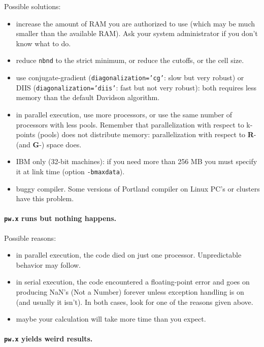 \documentclass[12pt,a4paper]{article}
\begin{document}
Possible solutions:
\begin{itemize}
  \item
    increase the amount of RAM you are authorized to use (which may be
    much smaller than the available RAM).
    Ask your system administrator if you don't know what to do.
  \item
    reduce \texttt{nbnd} to the strict minimum, or reduce the cutoffs,
    or the cell size.
  \item
    use conjugate-gradient (\texttt{diagonalization='cg'}: slow 
    but very robust) or DIIS (\texttt{diagonalization='diis'}: 
    fast but not very robust):
    both requires less memory than the default Davidson algorithm.
  \item
    in parallel execution, use more processors, or use the same number
    of processors with less pools.
    Remember that parallelization with respect to k-points (pools)
    does not distribute memory: parallelization with respect to
    \textbf{R}- (and \textbf{G}-) space does.
  \item
    IBM only (32-bit machines): if you need more than 256 MB you must
    specify it at link time (option \texttt{-bmaxdata}).
  \item
    buggy compiler.
    Some versions of Portland compiler on Linux PC's or clusters have
    this problem.
\end{itemize}

\paragraph{\texttt{pw.x} runs but nothing happens.}

Possible reasons:
\begin{itemize}
  \item
    in parallel execution, the code died on just one processor.
    Unpredictable behavior may follow.
  \item
    in serial execution, the code encountered a floating-point error
    and goes on producing NaN's (Not a Number) forever unless
    exception handling is on (and usually it isn't).
    In both cases, look for one of the reasons given above.
  \item
    maybe your calculation will take more time than you expect.
\end{itemize}

\paragraph{\texttt{pw.x} yields weird results.}
\end{document}
